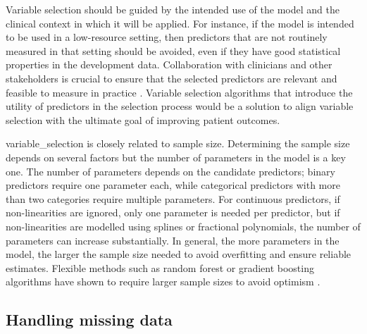 Variable selection should be guided by the intended use of the model and the clinical context in which it will be applied. For instance, if the model is intended to be used in a low-resource setting, then predictors that are not routinely measured in that setting should be avoided, even if they have good statistical properties in the development data. Collaboration with clinicians and other stakeholders is crucial to ensure that the selected predictors are relevant and feasible to measure in practice \cite{smitsImprovingHealthCare2026}. Variable selection algorithms that introduce the utility of predictors in the selection process would be a solution to align variable selection with the ultimate goal of improving patient outcomes. 

\Gls{variable_selection} is closely related to sample size. Determining the sample size depends on several factors but the number of parameters in the model is a key one. The number of parameters depends on the candidate predictors; binary predictors require one parameter each, while categorical predictors with more than two categories require multiple parameters. For continuous predictors, if non-linearities are ignored, only one parameter is needed per predictor, but if non-linearities are modelled using splines or fractional polynomials, the number of parameters can increase substantially. In general, the more parameters in the model, the larger the sample size needed to avoid \gls{overfitting} and ensure reliable estimates. Flexible methods such as random forest or gradient boosting algorithms have shown to require larger sample sizes to avoid optimism \cite{vanderploegModernModellingTechniques2014,austinRelativeDataHungriness2024}.  

\subsection{Handling missing data}

